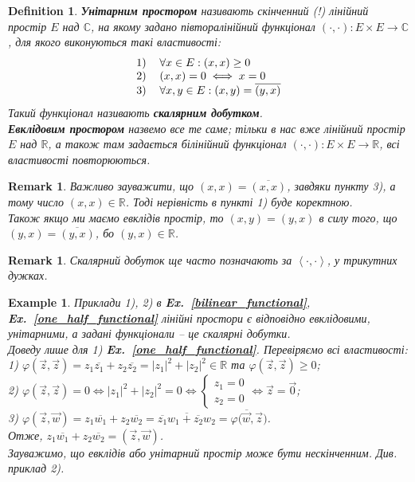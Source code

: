 \documentclass[a4paper, 10pt]{article}
\theoremstyle{theoremdd}
\newtheorem{definition}[theorem]{Definition}
\newtheorem{example}[theorem]{Example}
\newtheorem{remark}[theorem]{Remark}
\newcommand\exref[1]{\textbf{Ex.~\ref{#1}}}
\begin{document}
\begin{definition}
\textbf{Унітарним простором} називають скінченний (!) лінійний простір $E$ над $\mathbb{C}$, на якому задано півторалінійний функціонал $(\cdot, \cdot) \colon E \times E \to \mathbb{C}$, для якого виконуються такі властивості:
\begin{align*}
\begin{tabular}{cl}
1) & $\forall x \in E: (x, x) \geq 0$\\
2) & $(x, x) = 0 \iff x = 0$\\
3) & $\forall x,y \in E: (x, y) = \overline{(y, x)}$
\end{tabular}
\end{align*}
Такий функціонал називають \textbf{скалярним добутком}.
\bigskip \\
\textbf{Евклідовим простором} назвемо все те саме; тільки в нас вже лінійний простір $E$ над $\mathbb{R}$, а також там задається білінійний функціонал $(\cdot, \cdot) \colon E \times E \to \mathbb{R}$, всі властивості повторюються.
\end{definition}

\begin{remark}
Важливо зауважити, що $(x,x) = \overline{(x,x)}$, завдяки пункту 3), а тому число $(x,x) \in \mathbb{R}$. Тоді нерівність в пункті 1) буде коректною.\\
Також якщо ми маємо евклідів простір, то $(x,y) = (y,x)$ в силу того, що $(y,x) = \overline{(y,x)}$, бо $(y,x) \in \mathbb{R}$.
\end{remark}

\begin{remark}
Скалярний добуток ще часто позначають за $\left< \cdot, \cdot \right>$, у трикутних дужках.
\end{remark}

\begin{example}
Приклади 1), 2) в \exref{bilinear_functional}, \exref{one_half_functional} лінійні простори є відповідно евклідовими, унітарними, а задані функціонали -- це скалярні добутки.\\
Доведу лише для 1) \exref{one_half_functional}. Перевіряємо всі властивості:\\
1) $\varphi(\vec{z},\vec{z}) = z_1 \overline{z_1} + z_2 \overline{z_2} = |z_1|^2 + |z_2|^2 \in \mathbb{R}$ та $\varphi(\vec{z},\vec{z}) \geq 0$;\\
2) $\varphi(\vec{z},\vec{z}) = 0 \iff |z_1|^2 + |z_2|^2 = 0 \iff \begin{cases} z_1 = 0 \\ z_2 = 0 \end{cases} \iff \vec{z} = \vec{0}$;\\
3) $\varphi(\vec{z},\vec{w}) = z_1 \overline{w_1} + z_2 \overline{w_2} = \overline{\overline{z_1} w_1 + \overline{z_2} w_2} = \overline{\varphi(\vec{w},\vec{z}})$.\\
Отже, $z_1 \overline{w_1} + z_2 \overline{w_2} = (\vec{z},\vec{w})$.
\bigskip \\
Зауважимо, що евклідів або унітарний простір може бути нескінченним. Див. приклад 2).
\end{example}
\end{document}
